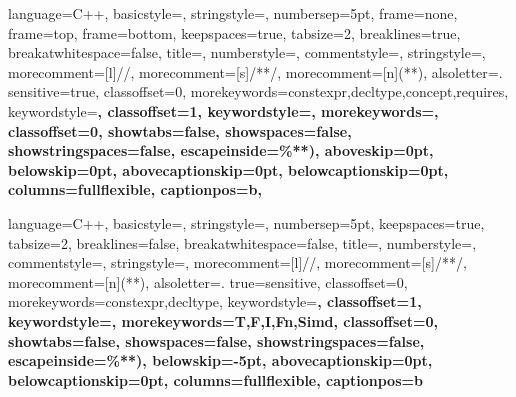 { %
	language=C++,
	basicstyle=\footnotesize\ttfamily\singlespacing,%
	stringstyle=\color{white}\footnotesize\ttfamily,
	numbersep=5pt,
	frame=none,
	frame=top,
	frame=bottom,
	keepspaces=true,
	tabsize=2,
	breaklines=true,
	breakatwhitespace=false,
	title=\lstname,
	numberstyle=\tiny\color{black},
	commentstyle=\footnotesize\ttfamily\color{gray},
	stringstyle=\footnotesize\ttfamily\color{mauve},
	morecomment=[l]{//},
	morecomment=[s]{/*}{*/},
	morecomment=[n]{(*}{*)},
	alsoletter={.}
	sensitive=true,
	classoffset=0,
	morekeywords={constexpr,decltype,concept,requires},
	keywordstyle=\bfseries\color{black}, %
	classoffset=1,
	keywordstyle=\bfseries\color{black}, %
	morekeywords={}, %
	classoffset=0,
	showtabs=false,
	showspaces=false,
	showstringspaces=false,  
	escapeinside={\%*}{*)},
	aboveskip=0pt,
	belowskip=0pt, 
	abovecaptionskip=0pt, 
	belowcaptionskip=0pt,
	columns=fullflexible,
	captionpos=b,
}


{ %
	language=C++, %
	basicstyle=\small\ttfamily,%
	stringstyle=\color{white}\normalsize\ttfamily,
	numbersep=5pt,
	keepspaces=true,
	tabsize=2,
	breaklines=false,
	breakatwhitespace=false,
	title=\lstname,
	numberstyle=\small\color{black},
	commentstyle=\small\ttfamily, %
	stringstyle=\small\ttfamily, %
	morecomment=[l]{//},
	morecomment=[s]{/*}{*/},
	morecomment=[n]{(*}{*)},
	alsoletter={.}
	true=sensitive,
	classoffset=0,
	morekeywords={constexpr,decltype},
	keywordstyle=\small\bfseries, %
	classoffset=1,
	keywordstyle=\small\bfseries, %
	morekeywords={T,F,I,Fn,Simd}, %
	classoffset=0,
	showtabs=false,
	showspaces=false,
	showstringspaces=false,  
	escapeinside={\%*}{*)},
	belowskip=-5pt, 
	abovecaptionskip=0pt, 
	belowcaptionskip=0pt,
	columns=fullflexible,
	captionpos=b
}
